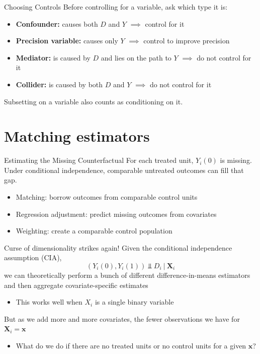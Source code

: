 \documentclass[aspectratio=169,t,11pt,table]{beamer}
\begin{document}
\begin{frame}{Choosing Controls}
  Before controlling for a variable, ask which type it is:
  \begin{itemize}
    \item \textbf{Confounder:} causes both $D$ and $Y$ $\implies$ \alert{control for it}
    \item \textbf{Precision variable:} causes only $Y$ $\implies$ \alert{control to improve precision}
    \item \textbf{Mediator:} is caused by $D$ and lies on the path to $Y$ $\implies$ \alert{do not control for it}
    \item \textbf{Collider:} is caused by both $D$ and $Y$ $\implies$ \alert{do not control for it}
  \end{itemize}

  \bigskip
  Subsetting on a variable also counts as conditioning on it.
\end{frame}


\section{Matching estimators}

\begin{frame}{Estimating the Missing Counterfactual}
  For each treated unit, $Y_i(0)$ is missing. Under conditional independence, comparable untreated outcomes can fill that gap.

  \bigskip
  \begin{itemize}
    \item \alert{Matching:} borrow outcomes from comparable control units
    \item \alert{Regression adjustment:} predict missing outcomes from covariates
    \item \alert{Weighting:} create a comparable control population
  \end{itemize}
\end{frame}

\begin{frame}{Curse of dimensionality strikes again!}
  Given the conditional independence assumption (CIA), 
  $$
    (Y_{i}(0), Y_{i}(1)) \Perp D_i \ \vert \ \bm{X}_i
  $$
  we can theoretically perform a bunch of different difference-in-means estimators and then aggregate covariate-specific estimates
  \begin{itemize}
    \item This works well when $X_i$ is a single binary variable
  \end{itemize}

  \pause
  \bigskip
  But as we add more and more covariates, the fewer observations we have for $\bm{X}_i = \bm{x}$
  \begin{itemize}
    \item What do we do if there are no treated units or no control units for a given $\bm{x}$?
  \end{itemize}
\end{frame}
\end{document}
